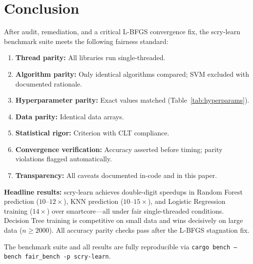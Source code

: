 \documentclass[11pt,a4paper]{article}
\begin{document}
\section{Conclusion}

After audit, remediation, and a critical L-BFGS convergence fix,
the scry-learn benchmark suite meets the following fairness standard:

\begin{enumerate}[nosep]
    \item \textbf{Thread parity:} All libraries run single-threaded.
    \item \textbf{Algorithm parity:} Only identical algorithms compared;
          SVM excluded with documented rationale.
    \item \textbf{Hyperparameter parity:} Exact values matched
          (Table~\ref{tab:hyperparams}).
    \item \textbf{Data parity:} Identical data arrays.
    \item \textbf{Statistical rigor:} Criterion with CLT compliance.
    \item \textbf{Convergence verification:} Accuracy asserted before
          timing; parity violations flagged automatically.
    \item \textbf{Transparency:} All caveats documented in-code and
          in this paper.
\end{enumerate}

\textbf{Headline results:} scry-learn achieves double-digit speedups
in Random Forest prediction ($10\text{--}12\times$), KNN prediction
($10\text{--}15\times$), and Logistic Regression training ($14\times$)
over smartcore---all under fair single-threaded conditions.
Decision Tree training is competitive on small data and wins
decisively on large data ($n \geq 2000$).
All accuracy parity checks pass after the L-BFGS stagnation fix.

The benchmark suite and all results are fully reproducible via
\texttt{cargo bench --bench fair\_bench -p scry-learn}.
\end{document}
